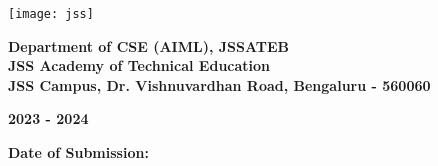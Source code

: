 \documentclass[12pt, a4paper]{article}
\begin{document}
\begin{titlepage}
		\vspace{0.5cm}
		\texttt{[image: jss]}
		
		\vspace{0.5cm}
		\small \textbf{Department of CSE (AIML), JSSATEB} \\
		\small \textbf{JSS Academy of Technical Education} \\
		\vspace{0.2cm}
		\small \textbf{JSS Campus, Dr. Vishnuvardhan Road, Bengaluru - 560060} \\
		\vspace{1cm}
		\begin{minipage}{0.45\textwidth}
			\raggedright
			\small \textbf{2023 - 2024}
		\end{minipage}
		\begin{minipage}{0.45\textwidth}
			\raggedleft
			\small \textbf{Date of Submission: \underline{\hspace{2.5cm}}}
		\end{minipage}
	\end{titlepage}
\end{document}
